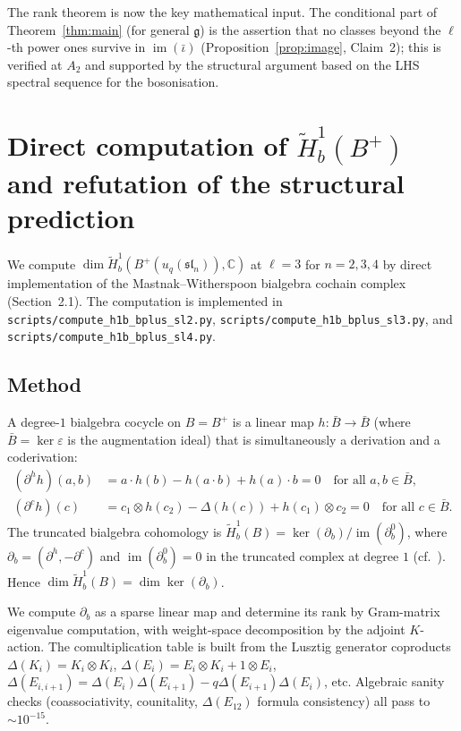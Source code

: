 \documentclass[11pt,letterpaper]{amsart}
\theoremstyle{plain}
\theoremstyle{definition}
\theoremstyle{remark}
\newcommand{\CC}{\mathbb{C}}
\begin{document}
The rank theorem is now the key mathematical input. The conditional part of Theorem~\ref{thm:main} (for general $\mathfrak{g}$) is the assertion that no classes beyond the $\ell$-th power ones survive in $\operatorname{im}(\bar\iota)$ (Proposition~\ref{prop:image}, Claim~2); this is verified at $A_2$ and supported by the structural argument based on the LHS spectral sequence for the bosonisation.

\section{Direct computation of $\tilde{H}^1_b(B^+)$ and refutation of the structural prediction}
\label{sec:h1brefutation}

We compute $\dim \tilde{H}^1_b(B^+(u_q(\mathfrak{sl}_n)), \CC)$ at $\ell = 3$ for $n = 2, 3, 4$ by direct implementation of the Mastnak--Witherspoon bialgebra cochain complex~\cite{MW08} (Section~2.1). The computation is implemented in \texttt{scripts/compute\_h1b\_bplus\_sl2.py}, \texttt{scripts/compute\_h1b\_bplus\_sl3.py}, and \texttt{scripts/compute\_h1b\_bplus\_sl4.py}.

\subsection{Method}

A degree-$1$ bialgebra cocycle on $B = B^+$ is a linear map $h: \bar{B} \to \bar{B}$ (where $\bar{B} = \ker \varepsilon$ is the augmentation ideal) that is simultaneously a derivation and a coderivation:
\begin{align*}
(\partial^h h)(a, b) &= a \cdot h(b) - h(a \cdot b) + h(a) \cdot b = 0 \quad \text{for all } a, b \in \bar{B}, \\
(\partial^c h)(c) &= c_1 \otimes h(c_2) - \Delta(h(c)) + h(c_1) \otimes c_2 = 0 \quad \text{for all } c \in \bar{B}.
\end{align*}
The truncated bialgebra cohomology is $\tilde{H}^1_b(B) = \ker(\partial_b) / \operatorname{im}(\partial_b^0)$, where $\partial_b = (\partial^h, -\partial^c)$ and $\operatorname{im}(\partial_b^0) = 0$ in the truncated complex at degree $1$ (cf.~\cite[\S 2.1]{MW08}). Hence $\dim \tilde{H}^1_b(B) = \dim \ker(\partial_b)$.

We compute $\partial_b$ as a sparse linear map and determine its rank by Gram-matrix eigenvalue computation, with weight-space decomposition by the adjoint $K$-action. The comultiplication table is built from the Lusztig generator coproducts $\Delta(K_i) = K_i \otimes K_i$, $\Delta(E_i) = E_i \otimes K_i + 1 \otimes E_i$, $\Delta(E_{i,i+1}) = \Delta(E_i)\Delta(E_{i+1}) - q \Delta(E_{i+1})\Delta(E_i)$, etc. Algebraic sanity checks (coassociativity, counitality, $\Delta(E_{12})$ formula consistency) all pass to $\sim 10^{-15}$.
\end{document}
